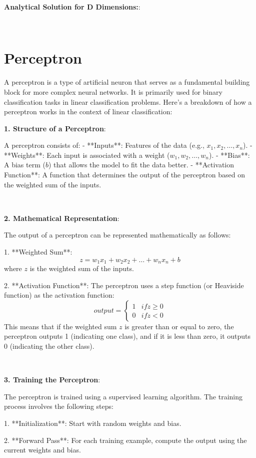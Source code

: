 \documentclass{article}
\newenvironment{cheatformula}[1][כותרת]{
    \begin{minipage}{\linewidth}
    \textbf{#1}:
}{
    \end{minipage}\\[2ex]
}
\begin{document}
\begin{multicols*}{2}
\begin{cheatformula}[Analytical Solution for D Dimensions:]
\end{cheatformula}

\pagebreak
\section{Perceptron}
A perceptron is a type of artificial neuron that serves as a fundamental building block for more complex neural networks. It is primarily used for binary classification tasks in linear classification problems. Here’s a breakdown of how a perceptron works in the context of linear classification:

\begin{cheatformula}[1. Structure of a Perceptron]
A perceptron consists of:
- **Inputs**: Features of the data (e.g., $x_1, x_2, \ldots, x_n$).
- **Weights**: Each input is associated with a weight ($w_1, w_2, \ldots, w_n$).
- **Bias**: A bias term ($b$) that allows the model to fit the data better.
- **Activation Function**: A function that determines the output of the perceptron based on the weighted sum of the inputs.
\end{cheatformula}

\begin{cheatformula}[2. Mathematical Representation]
The output of a perceptron can be represented mathematically as follows:

1. **Weighted Sum**:
   $$
   z = w_1x_1 + w_2x_2 + \ldots + w_nx_n + b
   $$
   where $z$ is the weighted sum of the inputs.

2. **Activation Function**:
   The perceptron uses a step function (or Heaviside function) as the activation function:
   $$
   output = 
   \begin{cases} 
   1 & if  z \geq 0 \\
   0 & if  z < 0 
   \end{cases}
   $$
   This means that if the weighted sum $z$ is greater than or equal to zero, the perceptron outputs 1 (indicating one class), and if it is less than zero, it outputs 0 (indicating the other class).
\end{cheatformula}


\begin{cheatformula}[3. Training the Perceptron]
The perceptron is trained using a supervised learning algorithm. The training process involves the following steps:

1. **Initialization**: Start with random weights and bias.

2. **Forward Pass**: For each training example, compute the output using the current weights and bias.


\end{cheatformula}
\end{multicols*}
\end{document}
